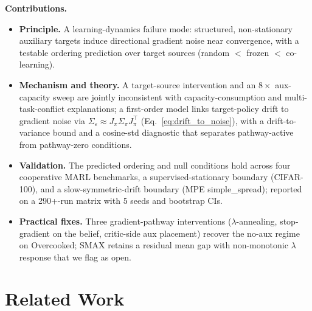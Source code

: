 \documentclass{article}
\theoremstyle{plain}
\theoremstyle{definition}
\theoremstyle{remark}
\begin{document}
\textbf{Contributions.}
\begin{itemize}
\item \textbf{Principle.} A learning-dynamics failure mode:
structured, non-stationary auxiliary targets induce directional
gradient noise near convergence, with a testable ordering prediction
over target sources (random $<$ frozen $<$ co-learning).
\item \textbf{Mechanism and theory.} A target-source intervention
and an $8\times$ aux-capacity sweep are jointly inconsistent with
capacity-consumption and multi-task-conflict explanations; a
first-order model links target-policy drift to gradient noise via
$\Sigma_\varepsilon \approx J_\pi \Sigma_\pi J_\pi^\top$
(Eq.~\eqref{eq:drift_to_noise}), with a drift-to-variance bound and
a cosine-std diagnostic that separates pathway-active from
pathway-zero conditions.
\item \textbf{Validation.} The predicted ordering and null conditions
hold across four cooperative MARL benchmarks, a supervised-stationary
boundary (CIFAR-100), and a slow-symmetric-drift boundary (MPE
simple\_spread); reported on a 290{+}-run matrix with 5 seeds and
bootstrap CIs.
\item \textbf{Practical fixes.} Three gradient-pathway interventions
($\lambda$-annealing, stop-gradient on the belief, critic-side aux
placement) recover the no-aux regime on Overcooked; SMAX retains a
residual mean gap with non-monotonic $\lambda$ response that we flag
as open.
\end{itemize}


\section{Related Work}
\label{sec:related}
\end{document}
